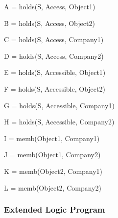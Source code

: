 \documentclass[a4paper]{article}
\begin{document}
        \begin{list}{}{}
          \item A = holds(S, Access, Object1)
          \item B = holds(S, Access, Object2)
          \item C = holds(S, Access, Company1)
          \item D = holds(S, Access, Company2)
          \item E = holds(S, Accessible, Object1)
          \item F = holds(S, Accessible, Object2)
          \item G = holds(S, Accessible, Company1)
          \item H = holds(S, Accessible, Company2)
          \item I = memb(Object1, Company1)
          \item J = memb(Object1, Company2)
          \item K = memb(Object2, Company1)
          \item L = memb(Object2, Company2)
        \end{list}

      \subsubsection{Extended Logic Program}
\end{document}
